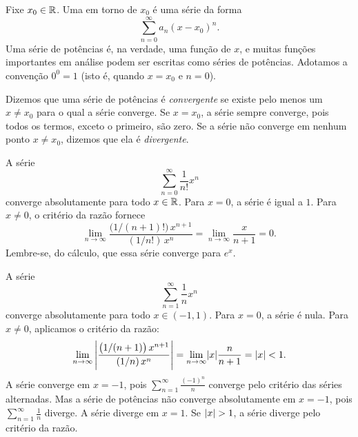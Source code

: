Fixe $x_0 \in {\mathbb{R}}$.
Uma \emph{} em torno de $x_0$
é uma série da forma
\begin{equation*}
\sum_{n=0}^\infty a_n {(x-x_0)}^n .
\end{equation*}
Uma série de potências é, na verdade, uma função de $x$, e
muitas funções importantes em análise podem ser escritas
como séries de potências. Adotamos a convenção
$0^0 = 1$ (isto é, quando $x=x_0$ e $n=0$).

Dizemos que uma série de potências é
\emph{convergente} se
existe pelo menos um $x \neq x_0$ para o qual a série converge.
Se $x=x_0$, a série sempre converge, pois todos os termos, exceto o primeiro, são zero.
Se a série não converge em nenhum ponto $x \neq x_0$, dizemos que
ela é \emph{divergente}.

\begin{example} \label{ps:expex}
A série
\begin{equation*}
\sum_{n=0}^\infty \frac{1}{n!} x^n
\end{equation*}
converge absolutamente para todo $x \in {\mathbb{R}}$.
Para $x=0$, a série é igual a $1$. Para $x \neq 0$, o critério da razão fornece
\begin{equation*}
\lim_{n \to \infty}
\frac{\bigl(1/(n+1)!\bigr) \, x^{n+1}}{(1/n!) \, x^{n}}
=
\lim_{n \to \infty}
\frac{x}{n+1}
=
0.
\end{equation*}
Lembre-se, do cálculo, que essa série converge para $e^x$.
\end{example}

\begin{example} \label{ps:1kex}
A série
\begin{equation*}
\sum_{n=1}^\infty \frac{1}{n} x^n
\end{equation*}
converge absolutamente para todo $x \in (-1,1)$.
Para $x=0$, a série é nula. Para $x \neq 0$, aplicamos o critério da razão:
\begin{equation*}
\lim_{n \to \infty}
\left\lvert {
\frac{\bigl(1/(n+1) \bigr) \, x^{n+1}}{(1/n) \, x^{n}}
} \right\rvert
=
\lim_{n \to \infty}
\lvert {x} \rvert \frac{n}{n+1}
=
\lvert {x} \rvert < 1 .
\end{equation*}
A série converge em $x=-1$, pois
$\sum_{n=1}^\infty \frac{{(-1)}^n}{n}$ converge
pelo critério das séries alternadas.
Mas a série de potências não converge absolutamente em $x=-1$, pois
$\sum_{n=1}^\infty \frac{1}{n}$ diverge.
A série diverge em $x=1$.
Se $\lvert {x} \rvert > 1$, a série diverge pelo critério da razão.
\end{example}

